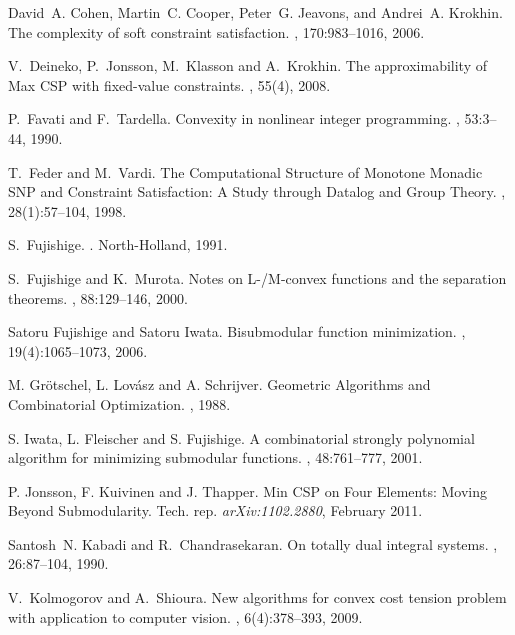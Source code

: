 \documentclass[11pt,onecolumn]{article}
\begin{document}
\begin{thebibliography}{10}
David~A. Cohen, Martin~C. Cooper, Peter~G. Jeavons, and Andrei~A. Krokhin.
\newblock The complexity of soft constraint satisfaction.
, 170:983--1016, 2006.

V.~Deineko, P.~Jonsson, M.~Klasson and A.~Krokhin.
\newblock The approximability of {Max}
  {C{S}{P}} with fixed-value constraints.
, 55(4), 2008.

P.~Favati and F.~Tardella.
\newblock Convexity in nonlinear integer programming.
, 53:3--44, 1990.

T.~Feder and M.~Vardi.
\newblock The {C}omputational {S}tructure of {M}onotone {M}onadic
  {S{N}{P}} and {C}onstraint {S}atisfaction: {A} {S}tudy through {D}atalog and
  {G}roup {T}heory.
, 28(1):57--104, 1998.

S.~Fujishige.
.
\newblock North-Holland, 1991.

S.~Fujishige and K.~Murota.
\newblock Notes on {L}-/{M}-convex functions and the separation theorems.
, 88:129--146, 2000.

Satoru Fujishige and Satoru Iwata.
\newblock Bisubmodular function minimization.
, 19(4):1065--1073, 2006.

M. Gr\"{o}tschel,  L. Lov\'{a}sz and A. Schrijver.
\newblock Geometric Algorithms and Combinatorial Optimization.
, 1988.

S. Iwata, L. Fleischer and S. Fujishige.
\newblock A combinatorial strongly polynomial algorithm for minimizing submodular functions.
, 48:761--777, 2001.


P. Jonsson, F. Kuivinen and J. Thapper.
\newblock Min {C}{S}{P} on Four Elements: Moving Beyond Submodularity.
\newblock Tech. rep. {\em arXiv:1102.2880}, February 2011.

Santosh~N. Kabadi and R.~Chandrasekaran.
\newblock On totally dual integral systems.
, 26:87--104, 1990.

V.~Kolmogorov and A.~Shioura.
\newblock New algorithms for convex cost tension problem with application to
  computer vision.
, 6(4):378--393, 2009.







\end{thebibliography}
\end{document}
